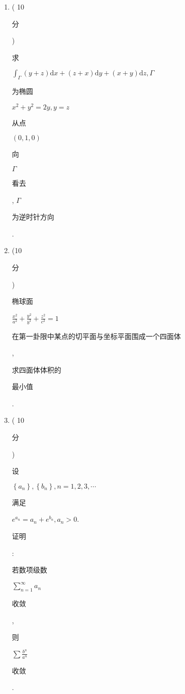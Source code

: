 \documentclass[10pt]{article}
\begin{document}
\begin{enumerate}
  \item ( 10 \begin{CJK}{UTF8}{mj}分\end{CJK}) \begin{CJK}{UTF8}{mj}求\end{CJK} $\int_{\Gamma}(y+z) \mathrm{d} x+(z+x) \mathrm{d} y+(x+y) \mathrm{d} z, \Gamma$ \begin{CJK}{UTF8}{mj}为椭圆\end{CJK} $x^{2}+y^{2}=2 y, y=z$ \begin{CJK}{UTF8}{mj}从点\end{CJK} $(0,1,0)$ \begin{CJK}{UTF8}{mj}向\end{CJK} $\Gamma$ \begin{CJK}{UTF8}{mj}看去\end{CJK}, $\Gamma$ \begin{CJK}{UTF8}{mj}为逆时针方向\end{CJK}.

  \item (10 \begin{CJK}{UTF8}{mj}分\end{CJK}) \begin{CJK}{UTF8}{mj}椭球面\end{CJK} $\frac{x^{2}}{a^{2}}+\frac{y^{2}}{b^{2}}+\frac{z^{2}}{c^{2}}=1$ \begin{CJK}{UTF8}{mj}在第一卦限中某点的切平面与坐标平面围成一个四面体\end{CJK}, \begin{CJK}{UTF8}{mj}求四面体体积的\end{CJK} \begin{CJK}{UTF8}{mj}最小值\end{CJK}.

  \item ( 10 \begin{CJK}{UTF8}{mj}分\end{CJK}) \begin{CJK}{UTF8}{mj}设\end{CJK} $\left\{a_{n}\right\},\left\{b_{n}\right\}, n=1,2,3, \cdots$ \begin{CJK}{UTF8}{mj}满足\end{CJK} $e^{a_{n}}=a_{n}+e^{b_{n}}, a_{n}>0$. \begin{CJK}{UTF8}{mj}证明\end{CJK}: \begin{CJK}{UTF8}{mj}若数项级数\end{CJK} $\sum_{n=1}^{\infty} a_{n}$ \begin{CJK}{UTF8}{mj}收敛\end{CJK}, \begin{CJK}{UTF8}{mj}则\end{CJK} $\sum \frac{b^{n}}{a^{n}}$ \begin{CJK}{UTF8}{mj}收敛\end{CJK}.

\end{enumerate}
\end{document}
